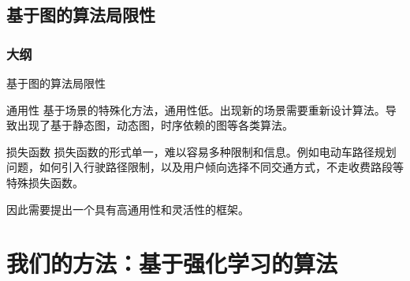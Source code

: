 \documentclass{beamer}
\begin{document}
\subsection{基于图的算法局限性}
\begin{frame}
\frametitle{大纲} %
\tableofcontents
    [
        currentsection,
        currentsubsection,
        subsectionstyle=show/shaded/hide
    ]
\end{frame}

\begin{frame}{基于图的算法局限性}

\begin{block}{通用性}
基于场景的特殊化方法，通用性低。出现新的场景需要重新设计算法。导致出现了基于静态图，动态图，时序依赖的图等各类算法。
\end{block}
\begin{block}{损失函数}
损失函数的形式单一，难以容易多种限制和信息。例如电动车路径规划问题，如何引入行驶路径限制，以及用户倾向选择不同交通方式，不走收费路段等特殊损失函数。
\end{block}
因此需要提出一个具有高通用性和灵活性的框架。
\end{frame}

\section{我们的方法：基于强化学习的算法}
\end{document}
